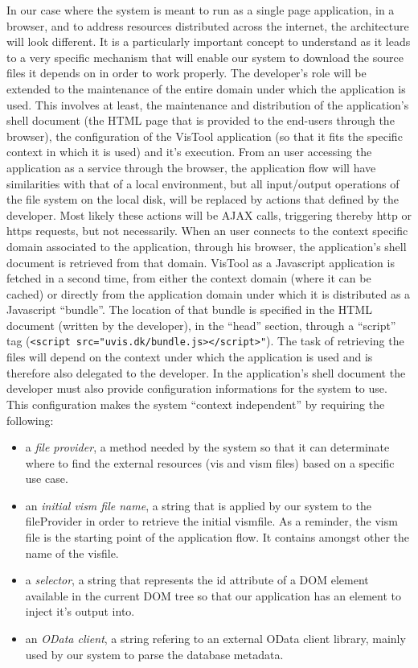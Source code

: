 In our case where the system is meant to run as a single page application, in a browser, and to address resources distributed across the internet, the architecture will look different. It is a particularly important concept to understand as it leads to a very specific mechanism that will enable our system to download the source files it depends on in order to work properly. The developer's role will be extended to the maintenance of the entire domain under which the application is used. This involves at least, the maintenance and distribution of the application's shell document (the HTML page that is provided to the end-users through the browser), the configuration of the VisTool application (so that it fits the specific context in which it is used) and it's execution. From an user accessing the application as a service through the browser, the application flow will have similarities with that of a local environment, but all input/output operations of the file system on the local disk, will be replaced by actions that defined by the developer. Most likely these actions will be AJAX calls, triggering thereby http or https requests, but not necessarily. When an user connects to the context specific domain associated to the application, through his browser, the application's shell document is retrieved from that domain. VisTool as a Javascript application is fetched in a second time, from either the context domain (where it can be cached) or directly from the application domain under which it is distributed as a Javascript ``bundle''. The location of that bundle is specified in the HTML document (written by the developer), in the ``head'' section, through a ``script'' tag (\texttt{<script src="uvis.dk/bundle.js></script>"}). The task of retrieving the files will depend on the context under which the application is used and is therefore also delegated to the developer. In the application's shell document the developer must also provide configuration informations for the system to use. This configuration makes the system ``context independent'' by requiring the following:
\begin{itemize}
    \item a \emph{file provider}, a method needed by the system so that it can determinate where to find the external resources (vis and vism files) based on a specific use case.
    \item an \emph{initial vism file name}, a string that is applied by our system to the fileProvider in order to retrieve the initial vismfile. As a reminder, the vism file is the starting point of the application flow. It contains amongst other the name of the visfile.
    \item a \emph{selector}, a string that represents the id attribute of a DOM element available in the current DOM tree so that our application has an element to inject it's output into.
    \item an \emph{OData client}, a string refering to an external OData client library, mainly used by our system to parse the database metadata.
\end{itemize}

